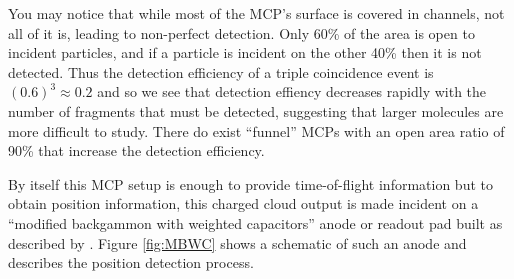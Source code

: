You may notice that while most of the MCP's surface is covered in channels, not all of it is, leading to non-perfect detection. Only 60\% of the area is open to incident particles, and if a particle is incident on the other 40\% then it is not detected. Thus the detection efficiency of a triple coincidence event is $(0.6)^3 \approx 0.2$ and so we see that detection effiency decreases rapidly with the number of fragments that must be detected, suggesting that larger molecules are more difficult to study. There do exist ``funnel'' MCPs with an open area ratio of 90\% that increase the detection efficiency.

By itself this MCP setup is enough to provide time-of-flight information but to obtain position information, this charged cloud output is made incident on a ``modified backgammon with weighted capacitors'' anode or readout pad built as described by \citet{Veshapidze02}. Figure \ref{fig:MBWC} shows a schematic of such an anode and describes the position detection process.

